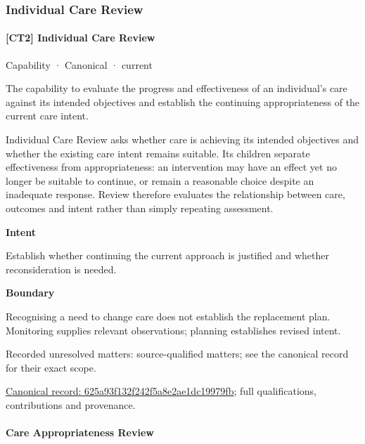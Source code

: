 \subsubsection{Individual Care Review}

\paragraph{[CT2] Individual Care Review}

\label{element:625a93f132f242f5a8e2ae1dc19979fb}
{\small Capability · Canonical · current}\par

The capability to evaluate the progress and effectiveness of an individual's care against its intended objectives and establish the continuing appropriateness of the current care intent.



Individual Care Review asks whether care is achieving its intended objectives and whether the existing care intent remains suitable. Its children separate effectiveness from appropriateness: an intervention may have an effect yet no longer be suitable to continue, or remain a reasonable choice despite an inadequate response. Review therefore evaluates the relationship between care, outcomes and intent rather than simply repeating assessment.



\textbf{Intent}



Establish whether continuing the current approach is justified and whether reconsideration is needed.



\textbf{Boundary}



Recognising a need to change care does not establish the replacement plan. Monitoring supplies relevant observations; planning establishes revised intent.


{\small Recorded unresolved matters: source-qualified matters; see the canonical record for their exact scope.}\par
{\footnotesize \href{../../../../continuum/strategy/capability/625a93f132f242f5a8e2ae1dc19979fb.md}{Canonical record: 625a93f132f242f5a8e2ae1dc19979fb}; full qualifications, contributions and provenance.}\par
\paragraph{Care Appropriateness Review}

